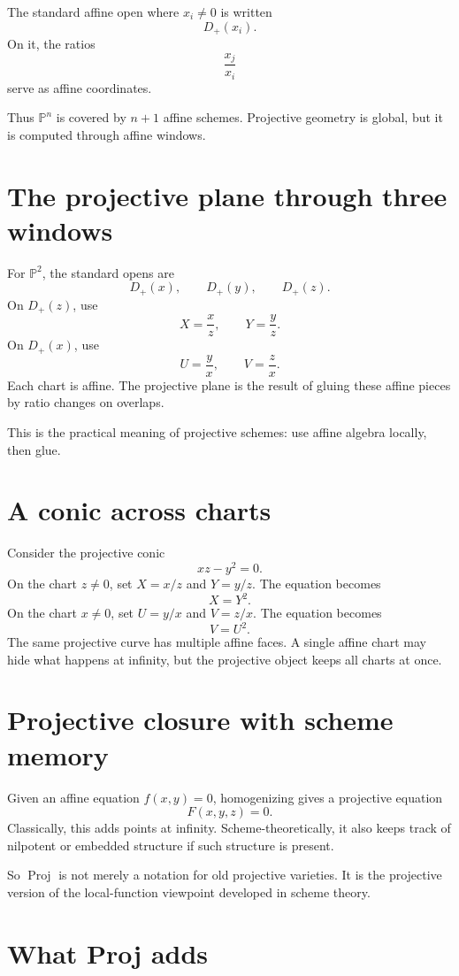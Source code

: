 The standard affine open where \(x_i\ne0\) is written
\[
  D_+(x_i).
\]
On it, the ratios
\[
  \frac{x_j}{x_i}
\]
serve as affine coordinates.

Thus \(\mathbb P^n\) is covered by \(n+1\) affine schemes. Projective geometry is global, but it is computed through affine windows.

\section{The projective plane through three windows}

For \(\mathbb P^2\), the standard opens are
\[
  D_+(x),
  \qquad
  D_+(y),
  \qquad
  D_+(z).
\]
On \(D_+(z)\), use
\[
  X=\frac{x}{z},
  \qquad
  Y=\frac{y}{z}.
\]
On \(D_+(x)\), use
\[
  U=\frac{y}{x},
  \qquad
  V=\frac{z}{x}.
\]
Each chart is affine. The projective plane is the result of gluing these affine pieces by ratio changes on overlaps.

This is the practical meaning of projective schemes: use affine algebra locally, then glue.

\section{A conic across charts}

Consider the projective conic
\[
  xz-y^2=0.
\]
On the chart \(z\ne0\), set \(X=x/z\) and \(Y=y/z\). The equation becomes
\[
  X=Y^2.
\]
On the chart \(x\ne0\), set \(U=y/x\) and \(V=z/x\). The equation becomes
\[
  V=U^2.
\]
The same projective curve has multiple affine faces. A single affine chart may hide what happens at infinity, but the projective object keeps all charts at once.

\section{Projective closure with scheme memory}

Given an affine equation \(f(x,y)=0\), homogenizing gives a projective equation
\[
  F(x,y,z)=0.
\]
Classically, this adds points at infinity. Scheme-theoretically, it also keeps track of nilpotent or embedded structure if such structure is present.

So \(\operatorname{Proj}\) is not merely a notation for old projective varieties. It is the projective version of the local-function viewpoint developed in scheme theory.

\section{What Proj adds}

